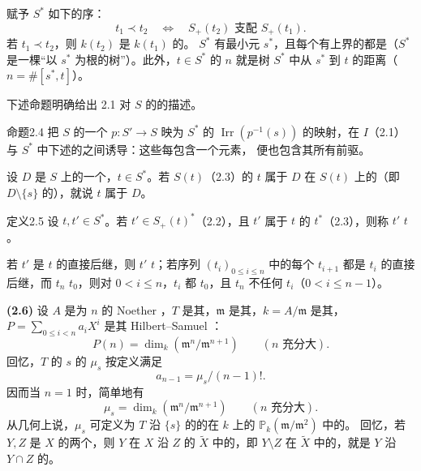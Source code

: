赋予 $S^*$ 如下的序：
\[
t_1\prec t_2\quad\Longleftrightarrow\quad S_+(t_2)\text{ 支配 }S_+(t_1).
\]
若 $t_1\prec t_2$，则 $k(t_2)$ 是 $k(t_1)$ 的。 $S^*$ 有最小元 $s^*$，且每个有上界的都是（$S^*$ 是一棵“以 $s^*$ 为根的树”）。此外，$t\in S^*$ 的 $n$ 就是树 $S^*$ 中从 $s^*$ 到 $t$ 的距离（$n=\#[s^*,t]$）。

下述命题明确给出 2.1 对 $S$ 的的描述。
\begin{SGAresult}{命题}{2.4}
把 $S$ 的一个 $p:S'\to S$ 映为 $S^*$ 的 $\operatorname{Irr}(p^{-1}(s))$ 的映射，在 $I$（2.1）与 $S^*$ 中下述的之间诱导：这些每包含一个元素，
便也包含其所有前驱。
\end{SGAresult}
设 $D$ 是 $S$ 上的一个，$t\in S^*$。若 $S(t)$（2.3）的 $t$ 属于 $D$ 在 $S(t)$ 上的（即 $D\setminus\{s\}$ 的），就说 $t$ 属于 $D$。

\begin{SGAresult}{定义}{2.5}
设 $t,t'\in S^*$。若 $t'\in S_+(t)^*$（2.2），且 $t'$ 属于 $t$ 的 $t^*$（2.3），则称 $t'$  $t$。
\end{SGAresult}
若 $t'$ 是 $t$ 的直接后继，则 $t'$  $t$；若序列 $(t_i)_{0\leq i\leq n}$ 中的每个 $t_{i+1}$ 都是 $t_i$ 的直接后继，而 $t_n$  $t_0$，则对 $0<i\leq n$，$t_i$ 都 $t_0$，且 $t_n$ 不任何 $t_i$（$0<i\leq n-1$）。

\textbf{(2.6)} 设 $A$ 是为 $n$ 的 Noether ，$T$ 是其，$\mathfrak m$ 是其，$k=A/\mathfrak m$ 是其，$P=\sum_{0\leq i<n}a_iX^i$ 是其 Hilbert--Samuel ：
\[
P(n)=\dim_k(\mathfrak m^n/\mathfrak m^{n+1})\qquad(n\text{ 充分大}).
\]
回忆，$T$ 的 $s$ 的 $\mu_s$ 按定义满足
\[
a_{n-1}=\mu_s/(n-1)!.
\]
因而当 $n=1$ 时，简单地有
\[
\mu_s=\dim_k(\mathfrak m^n/\mathfrak m^{n+1})\qquad(n\text{ 充分大}).
\]
从几何上说，$\mu_s$ 可定义为 $T$ 沿 $\{s\}$ 的的在 $k$ 上的 $\mathbb P_k(\mathfrak m/\mathfrak m^2)$ 中的。
回忆，若 $Y,Z$ 是 $X$ 的两个，则 $Y$ 在 $X$ 沿 $Z$ 的 $\widetilde X$ 中的，即 $Y\setminus Z$ 在 $\widetilde X$ 中的，就是 $Y$ 沿 $Y\cap Z$ 的。

